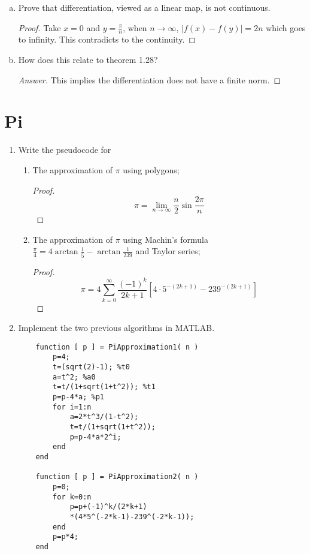 \begin{enumerate}
\begin{enumerate}[(a)]
\begin{proof}[Answer]
\begin{align*}
		\end{align*}
		\end{proof}
        \item Prove that differentiation, viewed as a linear map, is not continuous.
		\begin{proof}
		Take $x=0$ and $y=\frac{\pi}{n}$, when $n\to\infty$, $|f(x)-f(y)|=2n$ which goes to infinity.
		This contradicts to the continuity.
		\end{proof}
        \item How does this relate to theorem 1.28?
        \begin{proof}[Answer]
		This implies the differentiation does not have a finite norm.
        \end{proof}
    \end{enumerate}
\end{enumerate}

\section{Pi}
\begin{enumerate}
	\item Write the pseudocode for
    \begin{enumerate}
		\item The approximation of $\pi$ using polygons;
        \begin{proof}
        \[\pi=\lim_{n\to\infty}\frac{n}{2}\sin\frac{2\pi}{n} \]
        \end{proof}
        \item The approximation of $\pi$ using Machin's formula \(\frac{\pi}{4}=4\arctan\frac{1}{5}-\arctan\frac{1}{239}\) and Taylor series;
		\begin{proof}
			\[\pi=4\sum_{k=0}^{\infty}\frac{(-1)^k}{2k+1}\left[4\cdot5^{-(2k+1)}-239^{-(2k+1)} \right] \]
		\end{proof}
	\end{enumerate}
    \item Implement the two previous algorithms in MATLAB.
	\begin{lstlisting}
    function [ p ] = PiApproximation1( n )
    	p=4;
    	t=(sqrt(2)-1); %t0
        a=t^2; %a0
    	t=t/(1+sqrt(1+t^2)); %t1
    	p=p-4*a; %p1
    	for i=1:n
        	a=2*t^3/(1-t^2);
        	t=t/(1+sqrt(1+t^2));
        	p=p-4*a*2^i;
    	end
	end

	function [ p ] = PiApproximation2( n )
		p=0;
		for k=0:n
			p=p+(-1)^k/(2*k+1)
            *(4*5^(-2*k-1)-239^(-2*k-1));
		end
		p=p*4;
	end
	\end{lstlisting}
\end{enumerate}